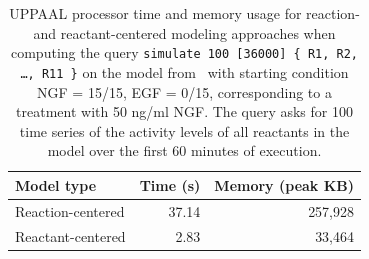 \documentclass{llncs}
\begin{document}
\begin{table}
  \begin{center}
  \begin{tabular}{|l||r|r|}
    \hline
    Model type & Time (s) & Memory (peak KB) \\
    \hline
    \hline
    Reaction-centered & 37.14 & 257,928 \\
    \hline
    Reactant-centered & 2.83 & 33,464 \\
    \hline
  \end{tabular}
  \end{center}
  \caption{UPPAAL processor time and memory usage for reaction- and reactant-centered modeling approaches when computing
  the query {\tt simulate 100 [36000] \{ R1, R2, \dots, R11 \}} on the model from~\cite{animo-ieee} with starting condition
  NGF = 15/15, EGF = 0/15, corresponding to a treatment with 50 ng/ml NGF.
  The query asks for 100 time series of the activity levels of all reactants in the model over the first 60 minutes
  of execution.\label{tab:sim-100}}
\end{table}
\end{document}
